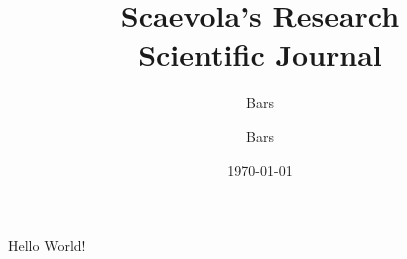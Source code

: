 \documentclass[a4paper,11pt]{article}
\title{	
	\normalfont\normalsize 
	{Scaevola's Research} \\ [0pt] %
	\huge Scientific Journal %
}\author{Bars}
\date{\vspace{-5pt}\normalsize\today}
\author{Bars}
\theoremstyle{definition}
\theoremstyle{remark}
\begin{document}
\maketitle

Hello World!
\end{document}
